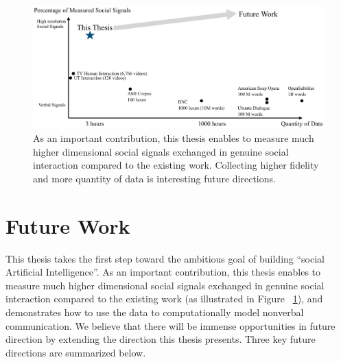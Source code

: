 \begin{figure}[t]	
	\includegraphics[width=\textwidth]{figures/summary}
	\caption{As an important contribution, this thesis enables to measure much higher dimensional social signals exchanged in genuine social interaction compared to the existing work. Collecting higher fidelity and more quantity of data is interesting future directions.}
	\label{fig:summary}
\end{figure}

\section{Future Work}
This thesis takes the first step toward the ambitious goal of building ``social Artificial Intelligence''. As an important contribution, this thesis enables to measure much higher dimensional social signals exchanged in genuine social interaction compared to the existing work (as illustrated in Figure
~\ref{fig:summary}), and demonstrates how to use the data to computationally model nonverbal communication. We believe that there will be immense opportunities in future direction by extending the direction this thesis presents. Three key future directions are summarized below.

